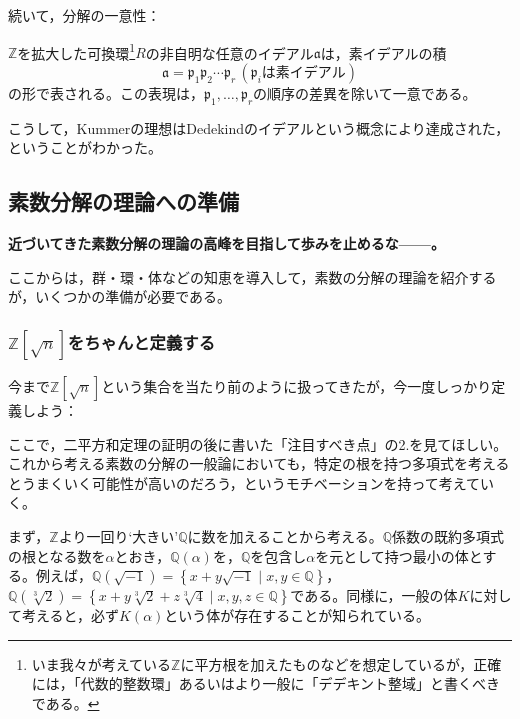 続いて，分解の一意性：

\begin{thm}\label{prime_ideal_break}
    $\mathbb{Z}$を拡大した可換環\footnote{いま我々が考えている$\mathbb{Z}$に平方根を加えたものなどを想定しているが，正確には，「代数的整数環」あるいはより一般に「デデキント整域」と書くべきである。}$R$の非自明な任意のイデアル$\mathfrak{a}$は，素イデアルの積\[
    \mathfrak{a}=\mathfrak{p}_1\mathfrak{p}_2\cdots\mathfrak{p}_r\, (\mathfrak{p}_i\text{は素イデアル})
    \]の形で表される。この表現は，$\mathfrak{p}_1,\ldots,\mathfrak{p}_r$の順序の差異を除いて一意である。
\end{thm}

こうして，Kummerの理想はDedekindのイデアルという概念により達成された，ということがわかった。

\subsection{素数分解の理論への準備}
\textbf{近づいてきた素数分解の理論の高峰を目指して歩みを止めるな------。}

\vspace{10pt}

ここからは，群・環・体などの知恵を導入して，素数の分解の理論を紹介するが，いくつかの準備が必要である。

\subsubsection{\texorpdfstring{$\mathbb{Z}[\sqrt{n}]$}{Z[sqrt{n}]}をちゃんと定義する}\label{zn_teigi}

今まで$\mathbb{Z}[\sqrt{n}]$という集合を当たり前のように扱ってきたが，今一度しっかり定義しよう：

ここで，二平方和定理の証明の後に書いた「注目すべき点」の2.を見てほしい。これから考える素数の分解の一般論においても，特定の根を持つ多項式を考えるとうまくいく可能性が高いのだろう，というモチベーションを持って考えていく。

まず，$\mathbb{Z}$より一回り`大きい'$\mathbb{Q}$に数を加えることから考える。$\mathbb{Q}$係数の既約多項式の根となる数を$\alpha$とおき，$\mathbb{Q}(\alpha)$を，$\mathbb{Q}$を包含し$\alpha$を元として持つ最小の体とする。例えば，$\mathbb{Q}(\sqrt{-1})=\left\{x+y\sqrt{-1}\mid x,y\in\mathbb{Q}\right\}$，$\mathbb{Q}(\sqrt[3]{2})=\left\{x+y\sqrt[3]{2}+z\sqrt[3]{4}\mid x,y,z\in\mathbb{Q}\right\}$である。同様に，一般の体$K$に対して考えると，必ず$K(\alpha)$という体が存在することが知られている。


